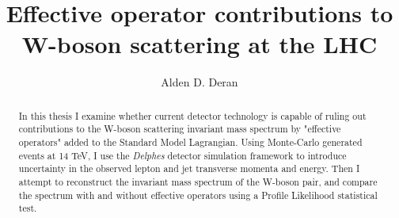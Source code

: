 \documentclass[10pt]{ucscthesisbs}
\begin{document}


\title{Effective operator contributions to W-boson scattering at the LHC}
\author{Alden D. Deran}
%
%



\maketitle
\copyrightpage

\begin{frontmatter}

\begin{abstract}
In this thesis I examine whether current detector technology is capable of ruling out contributions to the W-boson scattering invariant mass spectrum by "effective operators" added to the Standard Model Lagrangian. Using Monte-Carlo generated events at 14 TeV, I use the \textit{Delphes} detector simulation framework to introduce uncertainty in the observed lepton and jet transverse momenta and energy. Then I attempt to reconstruct the invariant mass spectrum of the W-boson pair, and compare the spectrum with and without effective operators using a Profile Likelihood statistical test. 
\end{abstract}
\tableofcontents
%
%
\listoffigures
\listoftables




\end{frontmatter}
\end{document}

